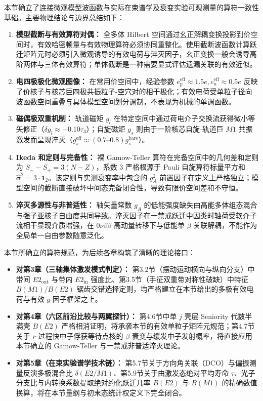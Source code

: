 本节确立了连接微观模型波函数与实际在束谱学及衰变实验可观测量的算符一致性基础。主要物理结论与边界总结如下：
\begin{enumerate}
\item \textbf{模型截断与有效算符对偶：} 全多体 Hilbert 空间通过幺正解耦变换投影到价空间时，有效哈密顿量与有效物理算符必须协同重整化。使用截断波函数计算跃迁矩阵元时必须引入微观诱导的有效电荷与淬灭因子，幺正变换一般会诱导高阶两体与三体有效算符；单体截断是一种需要显式评估遗漏关联的有效近似。
\item \textbf{电四极极化微观图像：} 在常用价空间中，经验参数 $e_p^{\mathrm{eff}} \approx 1.5e, e_n^{\mathrm{eff}} \approx 0.5e$ 反映了价核子与核芯巨四极共振粒子-空穴对的相干极化；有效电荷受单粒子径向波函数空间重叠与具体模型空间划分调制，不表现为机械的单调函数。
\item \textbf{磁偶极双重机制：} 轨道磁矩 $g_l$ 在特定空间中通过荷电介子交换流获得微小等矢修正（$\delta g_l \approx -0.10\tau_3$）；自旋磁矩 $g_s$ 则由于一阶核芯自旋-轨道巨 $M1$ 共振激发而呈现淬灭（$g_s^{\mathrm{eff}} \approx (0.7\text{--}0.8) g_s^{\mathrm{bare}}$）。
\item \textbf{Ikeda 和定则与完备性：} 裸 Gamow-Teller 算符在完备空间中的几何差和定则为 $S_- - S_+ = 3(N-Z)$，系数 3 严格根源于 Pauli 自旋算符标量平方和 $\hat{\boldsymbol{\sigma}}^2 = 3 \cdot \mathbf{1}_2$。该定则与实测衰变率中包含的 $g_A^2$ 前置因子在定义上严格独立；模型空间的截断直接破坏中间态完备闭合性，导致有限价空间差和不守恒。
\item \textbf{淬灭多源性与非普适性：} 轴矢量常数 $g_A$ 的低能强度缺失由高能多体组态混合与强子亚核子自由度共同导致。淬灭因子在一禁戒跃迁中因类时轴荷受软介子流相干显现介质增强，在 $0\nu\beta\beta$ 高动量转移下与低能单 $\beta$ 关联解耦，不能作为全局单一自由参数随意泛化。
\end{enumerate}

本节所确立的算符规范，为后续各章构筑了清晰的理论接口：
\begin{itemize}
\item \textbf{对第3章（三轴集体激发模式判定）：} 第3.2节（摆动运动横向与纵向分支）中带间 $E2_{\mathrm{out}}$ 与带内 $E2_{\mathrm{in}}$ 强度比、第3.5节（手征双重带对称性破缺）中特征 $B(M1)/B(E2)$ 锯齿交错选择定则，均严格建立在本节给出的多极有效电荷与有效 $g$ 因子框架之上。
\item \textbf{对第4章（六区前沿比较与两翼探针）：} 第4.6节中单 $j$ 壳层 Seniority 代数半满壳 $B(E2)$ 严格相消证明，将承袭本节的有效单粒子矩阵元规范；第4.7节关于 $r$-过程快中子俘获等待点核的 $\beta$ 衰变与缓发中子发射概率，将直接应用本节确立的 Gamow-Teller 与一禁戒非普适淬灭理论。
\item \textbf{对第5章（在束实验谱学技术链）：} 第5.7节关于方向角关联（DCO）与偏振测量反演多极混合比 $\delta(E2/M1)$、第5.9节关于由激发态绝对平均寿命 $\tau$、光子分支比与内转换系数提取绝对约化跃迁几率 $B(E2)$ 与 $B(M1)$ 的精确数值换算，将在本节量纲与初末态统计权定义下完全闭合。
\end{itemize}
